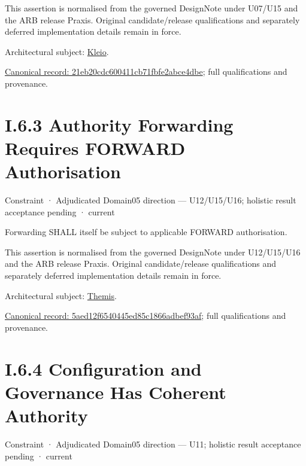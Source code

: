 This assertion is normalised from the governed DesignNote under U07/U15 and the ARB release Praxis. Original candidate/release qualifications and separately deferred implementation details remain in force.



Architectural subject: \hyperref[element:fefda110e2274884ad58906733606efd]{Kleio}.


{\footnotesize \href{../../../../../../../continuum/motivation/constraint/21eb20cdc600411cb71fbfe2abce4dbe.md}{Canonical record: 21eb20cdc600411cb71fbfe2abce4dbe}; full qualifications and provenance.}\par
\section*{I.6.3 Authority Forwarding Requires FORWARD Authorisation}
\label{navigation:I.6.3}

\label{element:5aed12f6540445ed85c1866adbef93af}
{\small Constraint · Adjudicated Domain05 direction — U12/U15/U16; holistic result acceptance pending · current}\par

Forwarding SHALL itself be subject to applicable FORWARD authorisation.



This assertion is normalised from the governed DesignNote under U12/U15/U16 and the ARB release Praxis. Original candidate/release qualifications and separately deferred implementation details remain in force.



Architectural subject: \hyperref[element:899d34ec491948b68aad09e507dea6d1]{Themis}.


{\footnotesize \href{../../../../../../../continuum/motivation/constraint/5aed12f6540445ed85c1866adbef93af.md}{Canonical record: 5aed12f6540445ed85c1866adbef93af}; full qualifications and provenance.}\par
\section*{I.6.4 Configuration and Governance Has Coherent Authority}
\label{navigation:I.6.4}

\label{element:7cdbc752ca2e4ebf9ee5acff84fd7400}
{\small Constraint · Adjudicated Domain05 direction — U11; holistic result acceptance pending · current}\par

